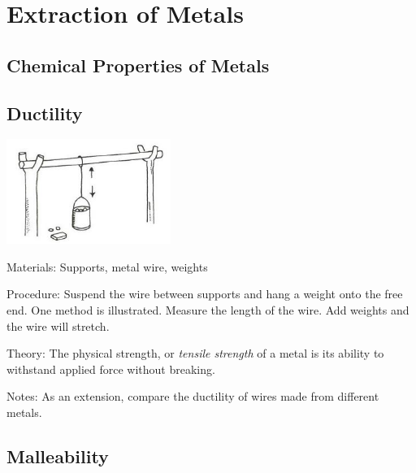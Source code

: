 \section{Extraction of Metals}

\begin{multicols}{2}


\section*{Chemical Properties of Metals}


\subsection{Ductility}

\begin{center}
\includegraphics[width=0.4\textwidth]{./img/vso/ductility.jpg}
\end{center}

\begin{description*}
\item[Materials:]{Supports, metal wire, weights}
\item[Procedure:]{Suspend the wire between
supports and hang a weight onto
the free end. One method is
illustrated. Measure the length of
the wire. Add weights and the
wire will stretch.}
\item[Theory:]{The physical strength, or \emph{tensile strength} of a metal is its ability to withstand applied force without breaking.}
\item[Notes:]{As an extension, compare the
ductility of wires made from
different metals.}
\end{description*}

\subsection{Malleability}


\end{multicols}
